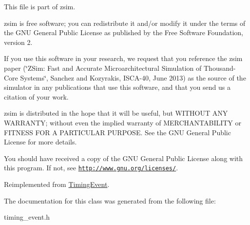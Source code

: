 This file is part of zsim.

zsim is free software; you can redistribute it and/or modify it under the terms of the G\-N\-U General Public License as published by the Free Software Foundation, version 2.

If you use this software in your research, we request that you reference the zsim paper (\char`\"{}\-Z\-Sim\-: Fast and Accurate Microarchitectural Simulation of
\-Thousand-\/\-Core Systems\char`\"{}, Sanchez and Kozyrakis, I\-S\-C\-A-\/40, June 2013) as the source of the simulator in any publications that use this software, and that you send us a citation of your work.

zsim is distributed in the hope that it will be useful, but W\-I\-T\-H\-O\-U\-T A\-N\-Y W\-A\-R\-R\-A\-N\-T\-Y; without even the implied warranty of M\-E\-R\-C\-H\-A\-N\-T\-A\-B\-I\-L\-I\-T\-Y or F\-I\-T\-N\-E\-S\-S F\-O\-R A P\-A\-R\-T\-I\-C\-U\-L\-A\-R P\-U\-R\-P\-O\-S\-E. See the G\-N\-U General Public License for more details.

You should have received a copy of the G\-N\-U General Public License along with this program. If not, see \href{http://www.gnu.org/licenses/}{\tt http\-://www.\-gnu.\-org/licenses/}. 

Reimplemented from \hyperlink{classTimingEvent_a55e7e2942d6607eb2a9dd484baf39070}{Timing\-Event}.



The documentation for this class was generated from the following file\-:\begin{DoxyCompactItemize}
\item 
timing\-\_\-event.\-h\end{DoxyCompactItemize}
